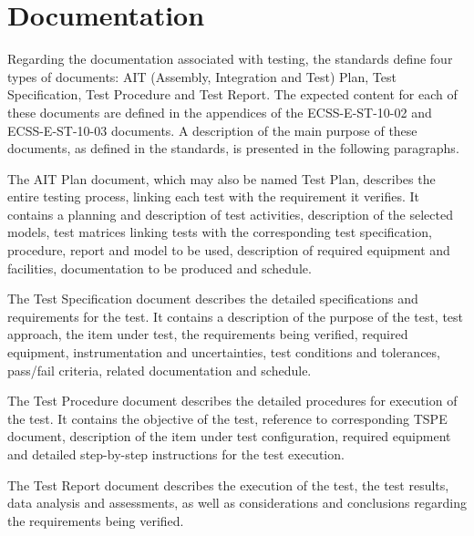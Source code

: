 %
%
%
%
%

%
%
%
%
%

\chapter{Documentation} \label{ch:documentation}

Regarding the documentation associated with testing, the standards define four types of documents: AIT (Assembly, Integration and Test) Plan, Test Specification, Test Procedure and Test Report.
The expected content for each of these documents are defined in the appendices of the ECSS-E-ST-10-02 \cite{ecss-e-st-10-02} and ECSS-E-ST-10-03 \cite{ecss-e-st-10-03} documents.
A description of the main purpose of these documents, as defined in the standards, is presented in the following paragraphs.

The AIT Plan document, which may also be named Test Plan, describes the entire testing process, linking each test with the requirement it verifies.
It contains a planning and description of test activities, description of the selected models, test matrices linking tests with the corresponding test specification, procedure, report and model to be used, description of required equipment and facilities, documentation to be produced and schedule.

The Test Specification document describes the detailed specifications and requirements for the test.
It contains a description of the purpose of the test, test approach, the item under test, the requirements being verified, required equipment, instrumentation and uncertainties, test conditions and tolerances, pass/fail criteria, related documentation and schedule.

The Test Procedure document describes the detailed procedures for execution of the test.
It contains the objective of the test, reference to corresponding TSPE document, description of the item under test configuration, required equipment and detailed step-by-step instructions for the test execution.

The Test Report document describes the execution of the test, the test results, data analysis and assessments, as well as considerations and conclusions regarding the requirements being verified.


